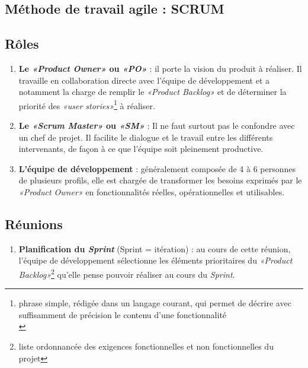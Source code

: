 \renewcommand{\thesection}{\Alph{section}}
\setcounter{section}{0}

\begin{appendices}%
\appendixheaderon

\section{Méthode de travail agile : SCRUM}
\label{ann:annexe1}
\subsection{Rôles}
\begin{enumerate}[parsep=0cm,itemsep=0cm]
\item \textbf{ Le \textit{«Product Owner»} ou \textit{«PO»} }: il porte la vision du produit à réaliser. Il travaille en collaboration directe avec l’équipe de développement et a notamment la charge de remplir le\textit{ «Product Backlog»} et de déterminer la priorité des \textit{«user stories»}\footnote{phrase simple, rédigée dans un langage courant, qui permet de décrire avec suffisamment de précision le contenu d’une fonctionnalité\\} à réaliser. 

\item \textbf{Le \textit{«Scrum Master»} ou \textit{«SM»}} : Il ne faut surtout pas le confondre avec un chef de projet. Il facilite le dialogue et le travail entre les différents intervenants, de façon à ce que l’équipe soit pleinement productive. 

\item \textbf{L’équipe de développement} : généralement composée de 4 à 6 personnes de plusieurs profils, elle est chargée de transformer les besoins exprimés par le \textit{«Product Owner»}  en fonctionnalités réelles, opérationnelles et utilisables. 
\end{enumerate}

\subsection{Réunions}
\begin{enumerate}[parsep=0cm,itemsep=0cm]
\item \textbf{Planification du \textit{Sprint}} (Sprint = itération) : au cours de cette réunion, l'équipe de développement sélectionne les éléments prioritaires du \textit{«Product Backlog»}\footnote{liste ordonnancée des exigences fonctionnelles et non fonctionnelles du projet} qu'elle pense pouvoir réaliser au cours du \textit{Sprint}.


\end{enumerate}
\end{appendices}
